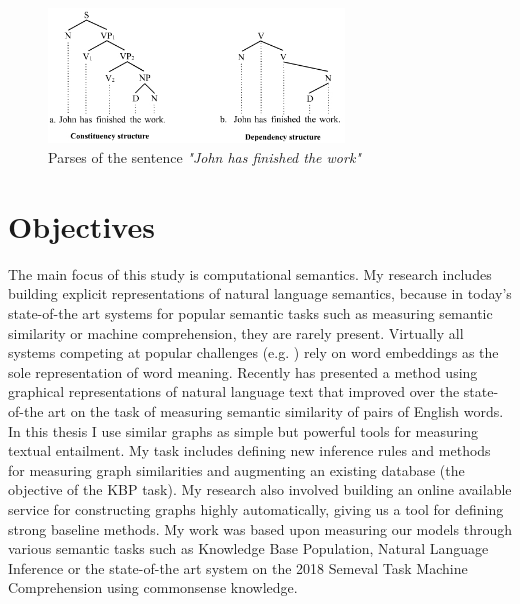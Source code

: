 \begin{figure}[h!]
	\centering
	\includegraphics[width=0.7\textwidth]{figures/Johnhasfinishedthework}
	\caption{Parses of the sentence \textit{"John has finished the work"} \cite{parsers}}
	\label{fig:johnfinished}
\end{figure}
\section{Objectives}
The main focus of this study is computational semantics. My research includes building explicit representations of natural language semantics, because in today's state-of-the art systems for popular semantic tasks such as measuring semantic similarity or machine comprehension, they are rarely present. Virtually all systems
competing at popular challenges (e.g. \cite{Cer:2017,Collados:2017}) rely on word embeddings as the sole representation of word meaning. Recently \cite{Recski:2016c} has presented a method using graphical representations of natural language text that improved over the state-of-the art on the task of
measuring semantic similarity of pairs of English words. In this thesis
I use similar graphs as simple but powerful tools for measuring textual
entailment. My task includes defining new inference rules and methods for measuring graph similarities and augmenting an existing database (the objective of the KBP task). My research also involved building an online available service for constructing graphs highly automatically, giving us a tool for defining strong baseline methods. My work was based upon measuring our models through various semantic tasks such as Knowledge Base Population, Natural Language Inference or the state-of-the art system on the 2018 Semeval Task Machine Comprehension using commonsense knowledge.

